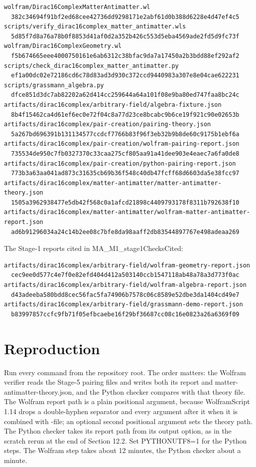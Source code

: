 \documentclass[11pt]{article}
\begin{document}
\begin{Verbatim}[fontsize=\small]
wolfram/Dirac16ComplexMatterAntimatter.wl
  382c34694f91bf2ed68cee42736dd9298171e2abf61d0b388d6228e4d47ef4c5
scripts/verify_dirac16complex_matter_antimatter.wls
  5d85f7d8a76a78b0f8853d41af0d2a352b426c553d5eba4569ade2fd5d9fc73f
wolfram/Dirac16ComplexGeometry.wl
  f5b674665eee4000750161e6ab6312c38bfac9da7a17450a2b3bdd88ef292af2
scripts/check_dirac16complex_matter_antimatter.py
  ef1a00dc02e72186cd6c78d83ad3d930c372ccd9440983a307e8e04cae622231
scripts/grassmann_algebra.py
  dfce851d3dc7ab82202a62d414cc259644a64a101f08e9ba80ed747faa8bc24c
artifacts/dirac16complex/arbitrary-field/algebra-fixture.json
  8b4f15462ca4d61ef6ec0e72f04c8a77d23ce8bcabc9b6ce19f921c90e02653b
artifacts/dirac16complex/pair-creation/pairing-theory.json
  5a267bd696391b131134577ccdcf7766b83f96f3eb32b9b8de60c9175b1ebf6a
artifacts/dirac16complex/pair-creation/wolfram-pairing-report.json
  735534de950c7fb0327370c33caa275cf805aa91a41dee903e4eaec7a6fa0de8
artifacts/dirac16complex/pair-creation/python-pairing-report.json
  773b3a63aa041ad873c31635cb69b36f548c40db47fcff68d6603da5e38fcc97
artifacts/dirac16complex/matter-antimatter/matter-antimatter-theory.json
  1505a3962938477e5db42f568c0a1afcd21898c4409793178f8311b792638f10
artifacts/dirac16complex/matter-antimatter/wolfram-matter-antimatter-report.json
  ad6b91296034a24c14b2ee08c7bfe8da98aaff2db83544897767e498adeaa269
\end{Verbatim}

The Stage-1 reports cited in MA\_M1\_stage1ChecksCited:

\begin{Verbatim}[fontsize=\small]
artifacts/dirac16complex/arbitrary-field/wolfram-geometry-report.json
  cec9ee0d577c4e7f0e82efd404d412a503140ccb1547118ab48a78a3d773f0ac
artifacts/dirac16complex/arbitrary-field/wolfram-algebra-report.json
  d43adeeba580bdd8cec56fac5fa74906b7578c06c8589e52dbe3da1404cd49e7
artifacts/dirac16complex/arbitrary-field/grassmann-demo-report.json
  b83997857ccfc9fb71f05efbcaebe16f29bf36687cc08c16e0823a26a6369f09
\end{Verbatim}

\section{Reproduction}

Run every command from the repository root. The order matters: the Wolfram verifier reads the Stage-5 pairing files and writes both its report and matter-antimatter-theory.json, and the Python checker compares with that theory file. The Wolfram report path is a plain positional argument, because WolframScript 1.14 drops a double-hyphen separator and every argument after it when it is combined with -file; an optional second positional argument sets the theory path. The Python checker takes its report path from its output option, as in the scratch rerun at the end of Section 12.2. Set PYTHONUTF8=1 for the Python steps. The Wolfram step takes about 12 minutes, the Python checker about a minute.
\end{document}

